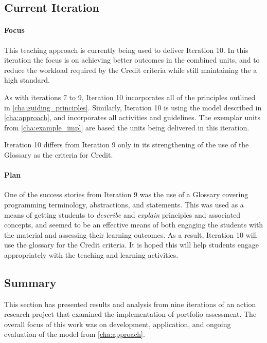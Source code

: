 

\subsection{Current Iteration} %

\paragraph{Focus}
This teaching approach is currently being used to deliver Iteration 10. In this iteration the focus is on achieving better outcomes in the combined units, and to reduce the workload required by the Credit criteria while still maintaining the a high standard.

As with iterations 7 to 9, Iteration 10 incorporates all of the principles outlined in \cref{cha:guiding_principles}. Similarly, Iteration 10 is using the model described in \cref{cha:approach}, and incorporates all activities and guidelines. The exemplar units from \cref{cha:example_impl} are based the units being delivered in this iteration.

Iteration 10 differs from Iteration 9 only in its strengthening of the use of the Glossary as the criteria for Credit.

\paragraph{Plan}
One of the success stories from Iteration 9 was the use of a Glossary covering programming terminology, abstractions, and statements. This was used as a means of getting students to \emph{describe} and \emph{explain} principles and associated concepts, and seemed to be an effective means of both engaging the students with the material and assessing their learning outcomes. As a result, Iteration 10 will use the glossary for the Credit criteria. It is hoped this will help students engage appropriately with the teaching and learning activities.


\subsection{Summary} %
\label{sub:action_summary}

This section has presented results and analysis from nine iterations of an action research project that examined the implementation of portfolio assessment. The overall focus of this work was on development, application, and ongoing evaluation of the model from \cref{cha:approach}.

